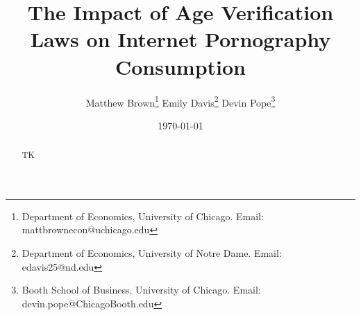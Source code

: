 
\usepackage{tikz}
\usepackage{appendix} 
\usepackage{chngcntr}



% 

\usepackage[utf8]{inputenc}
\usepackage{adjustbox}
\usepackage{caption}
\usepackage{subfiles}

\usepackage{siunitx}
\newcolumntype{d}{S[
    input-open-uncertainty=,
    input-close-uncertainty=,
    parse-numbers = false,
    table-align-text-pre=false,
    table-align-text-post=false
 ]}
 



\setlength{\bibsep}{0pt}

\title{The Impact of Age Verification Laws on Internet Pornography Consumption}  

\author{Matthew Brown\thanks{Department of Economics, University of Chicago. Email: mattbrownecon@uchicago.edu} \quad Emily Davis\thanks{Department of Economics, University of Notre Dame. Email: edavis25@nd.edu} \quad Devin Pope\thanks{Booth School of Business, University of Chicago. Email: devin.pope@ChicagoBooth.edu}}
\date{\today}
 
\renewcommand \thepart{}
\renewcommand \partname{} 



\doparttoc %
\faketableofcontents %


\maketitle

\vspace{-20px}
\begin{abstract}
TK
\end{abstract}

